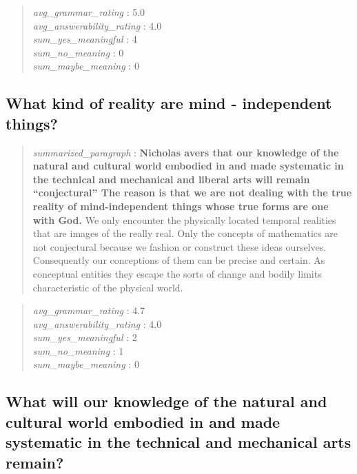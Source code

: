 \begin{quote}
\emph{avg\_grammar\_rating} : 5.0\\
\emph{avg\_answerability\_rating} : 4.0\\
\emph{sum\_yes\_meaningful} : 4\\
\emph{sum\_no\_meaning} : 0\\
\emph{sum\_maybe\_meaning} : 0
\end{quote}

\hypertarget{what-kind-of-reality-are-mind---independent-things}{%
\subsection{What kind of reality are mind - independent
things?}\label{what-kind-of-reality-are-mind---independent-things}}

\begin{quote}
\emph{summarized\_paragraph} : \textbf{Nicholas avers that our knowledge
of the natural and cultural world embodied in and made systematic in the
technical and mechanical and liberal arts will remain ``conjectural''
The reason is that we are not dealing with the true reality of
mind-independent things whose true forms are one with God.} We only
encounter the physically located temporal realities that are images of
the really real. Only the concepts of mathematics are not conjectural
because we fashion or construct these ideas ourselves. Consequently our
conceptions of them can be precise and certain. As conceptual entities
they escape the sorts of change and bodily limits characteristic of the
physical world.
\end{quote}

\begin{quote}
\emph{avg\_grammar\_rating} : 4.7\\
\emph{avg\_answerability\_rating} : 4.0\\
\emph{sum\_yes\_meaningful} : 2\\
\emph{sum\_no\_meaning} : 1\\
\emph{sum\_maybe\_meaning} : 0
\end{quote}

\hypertarget{what-will-our-knowledge-of-the-natural-and-cultural-world-embodied-in-and-made-systematic-in-the-technical-and-mechanical-arts-remain}{%
\subsection{What will our knowledge of the natural and cultural world
embodied in and made systematic in the technical and mechanical arts
remain?}\label{what-will-our-knowledge-of-the-natural-and-cultural-world-embodied-in-and-made-systematic-in-the-technical-and-mechanical-arts-remain}}

